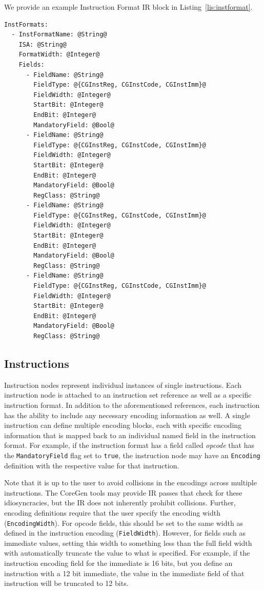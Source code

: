 \documentclass{article}
\begin{document}
We provide an example Instruction Format IR block in Listing~\ref{lis:instformat}.  

\vspace{0.125in}
\begin{lstlisting}[frame=single,style=base,caption={Instruction Format Node Definition},captionpos=b,label={lis:instformat}]
InstFormats:
  - InstFormatName: @String@
    ISA: @String@
    FormatWidth: @Integer@
    Fields:
      - FieldName: @String@
        FieldType: @{CGInstReg, CGInstCode, CGInstImm}@
        FieldWidth: @Integer@
        StartBit: @Integer@
        EndBit: @Integer@
        MandatoryField: @Bool@
      - FieldName: @String@
        FieldType: @{CGInstReg, CGInstCode, CGInstImm}@
        FieldWidth: @Integer@
        StartBit: @Integer@
        EndBit: @Integer@
        MandatoryField: @Bool@
        RegClass: @String@
      - FieldName: @String@
        FieldType: @{CGInstReg, CGInstCode, CGInstImm}@
        FieldWidth: @Integer@
        StartBit: @Integer@
        EndBit: @Integer@
        MandatoryField: @Bool@
        RegClass: @String@
      - FieldName: @String@
        FieldType: @{CGInstReg, CGInstCode, CGInstImm}@
        FieldWidth: @Integer@
        StartBit: @Integer@
        EndBit: @Integer@
        MandatoryField: @Bool@
        RegClass: @String@
\end{lstlisting}

\clearpage
\subsection{Instructions}
\label{sec:InstructionNodes}

Instruction nodes represent individual instances of single instructions.  Each instruction 
node is attached to an instruction set reference as well as a specific instruction format.  In addition 
to the aforementioned references, each instruction has the ability to include any necessary encoding 
information as well.  A single instruction can define multiple encoding blocks, each with specific 
encoding information that is mapped back to an individual named field in the instruction format.  For example, 
if the instruction format has a field called \textit{opcode} that has the \texttt{MandatoryField} flag set to \texttt{true}, 
the instruction node may have an \texttt{Encoding} definition with the respective value for that instruction.  

Note that it is up to the user to avoid collisions in the encodings across multiple instructions.  The CoreGen tools 
may provide IR passes that check for these idiosyncracies, but the IR does not inherently prohibit collisions.  Further, 
encoding definitions require that the user specify the encoding width (\texttt{EncodingWidth}).  For opcode fields, this 
should be set to the same width as defined in the instruction encoding (\texttt{FieldWidth}).  However, for fields such 
as immediate values, setting this width to something less than the full field width with automatically truncate the value 
to what is specified.  For example, if the instruction encoding field for the immediate is 16 bits, but you define an instruction 
with a 12 bit immediate, the value in the immediate field of that instruction will be truncated to 12 bits.
\end{document}
